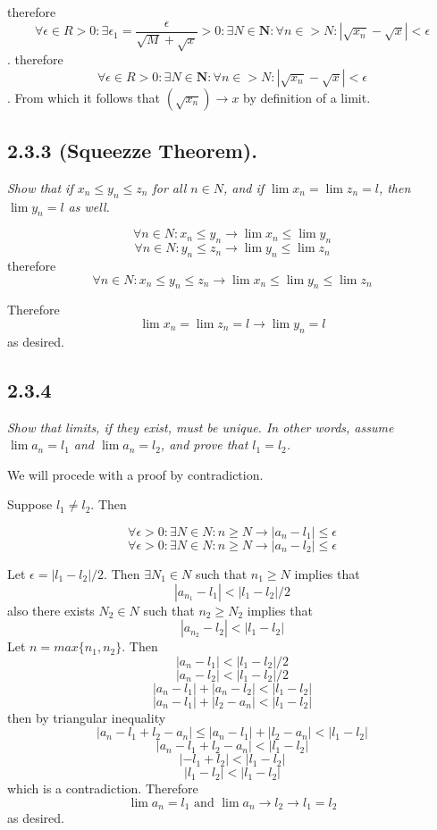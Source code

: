 \documentclass[11pt,oneside,titlepage]{book}
\begin{document}
therefore
$$\forall \epsilon \in R > 0: \exists \epsilon_1 = \frac{\epsilon}{\sqrt{M}
  + \sqrt{x}} > 0:
\exists N \in \textbf{N}: \forall n \in  > N: |\sqrt{x_n} - \sqrt{x}|
< \epsilon$$.
therefore
$$\forall \epsilon \in R > 0: 
\exists N \in \textbf{N}: \forall n \in  > N: |\sqrt{x_n} - \sqrt{x}|
< \epsilon$$.
From which it follows that $(\sqrt{x_n}) \to x$ by definition of a limit.

\subsection*{2.3.3 (Squeezze Theorem).}
\textit{Show that if $x_n \leq y_n \leq z_n$ for all $n \in N$, and if
  $\lim x_n = \lim z_n = l$, then $\lim y_n = l$ as well.}

$$\forall n \in N: x_n \leq y_n \to \lim x_n \leq \lim y_n$$
$$\forall n \in N: y_n \leq z_n \to \lim y_n \leq \lim z_n$$
therefore
$$\forall n \in N: x_n \leq y_n \leq z_n \to  \lim x_n \leq \lim y_n \leq \lim z_n$$

Therefore
$$\lim x_n = \lim z_n = l \to \lim y_n = l$$
as desired.

\subsection*{2.3.4}
\textit{Show that limits, if they exist, must be unique. In other words,
  assume $\lim a_n = l_1$ and $\lim a_n = l_2$, and prove that $l_1 = l_2$.}

We will procede with a proof by contradiction.

Suppose $l_1 \neq l_2$. Then

$$\forall \epsilon > 0: \exists N \in N: n \geq N \to |a_n - l_1| \leq \epsilon$$
$$\forall \epsilon > 0: \exists N \in N: n \geq N \to |a_n - l_2| \leq \epsilon$$

Let $\epsilon = |l_1 - l_2|/2$. Then $\exists N_1 \in N$ such that $n_1 \geq N$
implies that 
$$|a_{n_1} - l_1| < |l_1 - l_2|/2$$
also there exists $N_2 \in N$ such that  $n_2 \geq N_2$ implies that 
$$|a_{n_2} - l_2| < |l_1 - l_2|$$
Let $n = max\{n_1, n_2\}$. Then
$$|a_n - l_1| < |l_1 - l_2|/2$$
$$|a_n - l_2| < |l_1 - l_2|/2$$
$$|a_n - l_1| + |a_n - l_2| < |l_1 - l_2|$$
$$|a_n - l_1| + |l_2 - a_n| < |l_1 - l_2|$$
then by triangular inequality
$$|a_n - l_1 + l_2 - a_n| \leq |a_n - l_1| + |l_2 - a_n| < |l_1 - l_2| $$
$$|a_n - l_1 + l_2 - a_n| < |l_1 - l_2| $$
$$| - l_1 + l_2| < |l_1 - l_2| $$
$$| l_1 - l_2| < |l_1 - l_2| $$
which is a contradiction. Therefore
$$\lim a_n = l_1 \text{ and } \lim a_n \to l_2 \to l_1 = l_2$$
as desired.
\end{document}

